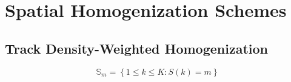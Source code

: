 \documentclass[12pt,twoside]{mitthesis-exec}
\begin{document}
%
%

\section*{Spatial Homogenization Schemes}

\subsection*{Track Density-Weighted Homogenization}

\begin{equation}
\label{eqn:imgxs-set}
\mathbb{S}_{m} = \left\{1 \le k \le K: S(k) = m\right\}
\end{equation}
\end{document}
